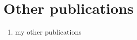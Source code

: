 \chapter[Other publications]{Other publications}

\begin{enumerate}
  \setcounter{enumi}{0}
  \item my other publications
\end{enumerate}

